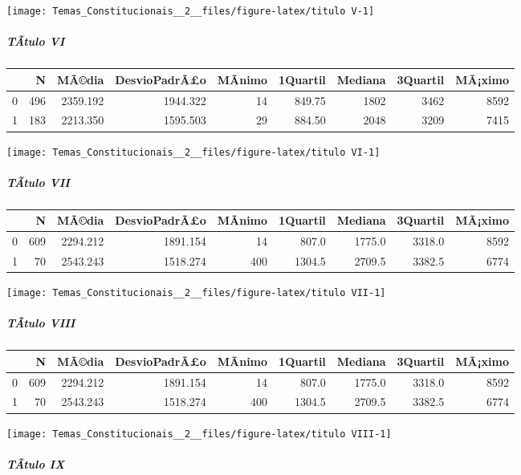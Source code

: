 \documentclass[]{article}
\let\oldsubparagraph\subparagraph
\renewcommand{\subparagraph}[1]{\oldsubparagraph{#1}\mbox{}}
\begin{document}
\begin{center}\texttt{[image: Temas\_Constitucionais\_\_2\_\_files/figure-latex/titulo V-1]} \end{center}

\subparagraph{TÃ­tulo VI}\label{tatulo-vi}

\begin{longtable}[]{@{}lrrrrrrrr@{}}
\toprule
& N & MÃ©dia & DesvioPadrÃ£o & MÃ­nimo & 1Quartil & Mediana & 3Quartil &
MÃ¡ximo\tabularnewline
\midrule
\endhead
0 & 496 & 2359.192 & 1944.322 & 14 & 849.75 & 1802 & 3462 &
8592\tabularnewline
1 & 183 & 2213.350 & 1595.503 & 29 & 884.50 & 2048 & 3209 &
7415\tabularnewline
\bottomrule
\end{longtable}

\begin{center}\texttt{[image: Temas\_Constitucionais\_\_2\_\_files/figure-latex/titulo VI-1]} \end{center}

\subparagraph{TÃ­tulo VII}\label{tatulo-vii}

\begin{longtable}[]{@{}lrrrrrrrr@{}}
\toprule
& N & MÃ©dia & DesvioPadrÃ£o & MÃ­nimo & 1Quartil & Mediana & 3Quartil &
MÃ¡ximo\tabularnewline
\midrule
\endhead
0 & 609 & 2294.212 & 1891.154 & 14 & 807.0 & 1775.0 & 3318.0 &
8592\tabularnewline
1 & 70 & 2543.243 & 1518.274 & 400 & 1304.5 & 2709.5 & 3382.5 &
6774\tabularnewline
\bottomrule
\end{longtable}

\begin{center}\texttt{[image: Temas\_Constitucionais\_\_2\_\_files/figure-latex/titulo VII-1]} \end{center}

\subparagraph{TÃ­tulo VIII}\label{tatulo-viii}

\begin{longtable}[]{@{}lrrrrrrrr@{}}
\toprule
& N & MÃ©dia & DesvioPadrÃ£o & MÃ­nimo & 1Quartil & Mediana & 3Quartil &
MÃ¡ximo\tabularnewline
\midrule
\endhead
0 & 609 & 2294.212 & 1891.154 & 14 & 807.0 & 1775.0 & 3318.0 &
8592\tabularnewline
1 & 70 & 2543.243 & 1518.274 & 400 & 1304.5 & 2709.5 & 3382.5 &
6774\tabularnewline
\bottomrule
\end{longtable}

\begin{center}\texttt{[image: Temas\_Constitucionais\_\_2\_\_files/figure-latex/titulo VIII-1]} \end{center}

\subparagraph{TÃ­tulo IX}\label{tatulo-ix}
\end{document}
